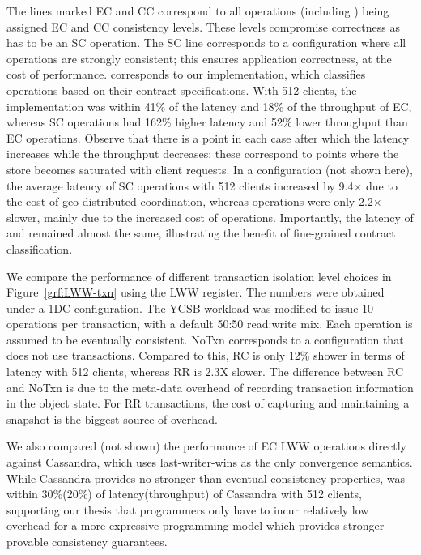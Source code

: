 The lines marked EC and CC correspond to all operations (including
) being assigned EC and CC consistency levels. These levels
compromise correctness as  has to be an SC operation. The SC line
corresponds to a configuration where all operations are strongly consistent;
this ensures application correctness, at the cost of performance. \name
corresponds to our implementation, which classifies operations based on their
contract specifications. With 512 clients, the \name implementation was within
41\% of the latency and 18\% of the throughput of EC, whereas SC operations had
162\% higher latency and 52\% lower throughput than EC operations. Observe that
there is a point in each case after which the latency increases while the
throughput decreases; these correspond to points where the store becomes
saturated with client requests. In a  configuration (not shown here),
the average latency of SC operations with 512 clients increased by 9.4$\times$
due to the cost of geo-distributed coordination, whereas \name operations were
only 2.2$\times$ slower, mainly due to the increased cost of 
operations. Importantly, the latency of  and 
remained almost the same, illustrating the benefit of fine-grained contract
classification.

We compare the performance of different transaction isolation level choices in
Figure~\ref{grf:LWW-txn} using the LWW register. The numbers were obtained
under a 1DC configuration. The YCSB workload was modified to issue 10
operations per transaction, with a default 50:50 read:write mix. Each operation
is assumed to be eventually consistent. NoTxn corresponds to a configuration
that does not use transactions. Compared to this, RC is only 12\% shower in
terms of latency with 512 clients, whereas RR is 2.3X slower. The difference
between RC and NoTxn is due to the meta-data overhead of recording transaction
information in the object state. For RR transactions, the cost of capturing and
maintaining a snapshot is the biggest source of overhead.

We also compared (not shown) the performance of EC LWW operations directly
against Cassandra, which uses last-writer-wins as the only convergence
semantics. While Cassandra provides no stronger-than-eventual consistency
properties, \name was within 30\%(20\%) of latency(throughput) of Cassandra
with 512 clients, supporting our thesis that programmers only have to incur
relatively low overhead for a more expressive programming model which provides
stronger provable consistency guarantees.


